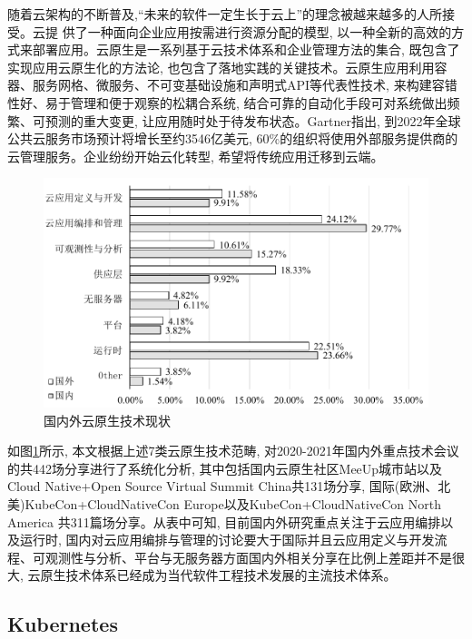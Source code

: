 随着云架构的不断普及,“未来的软件一定生长于云上”的理念被越来越多的人所接受。云提
供了一种面向企业应用按需进行资源分配的模型, 以一种全新的高效的方式来部署应用。云原生是一系列基于云技术体系和企业管理方法的集合, 既包含了实现应用云原生化的方法论, 也包含了落地实践的关键技术。云原生应用利用容器、服务网格、微服务、不可变基础设施和声明式API等代表性技术, 来构建容错性好、易于管理和便于观察的松耦合系统, 结合可靠的自动化手段可对系统做出频繁、可预测的重大变更, 让应用随时处于待发布状态。Gartner指出, 到2022年全球公共云服务市场预计将增长至约3546亿美元, 60\%的组织将使用外部服务提供商的云管理服务\cite{bhagavan2020achieving}。企业纷纷开始云化转型, 希望将传统应用迁移到云端。

\begin{figure}[h] %
    \centering %
    \includegraphics[width=0.9 \textwidth]{FIGs/chapter2/workshop.pdf} %
    \caption{国内外云原生技术现状} %
    \label{workshop} %
\end{figure}%

如图\ref{workshop}所示, 本文根据上述7类云原生技术范畴, 对2020-2021年国内外重点技术会议的共442场分享进行了系统化分析, 其中包括国内云原生社区MeeUp城市站以及Cloud Native+Open Source Virtual Summit China共131场分享, 国际(欧洲、北美)KubeCon+CloudNativeCon Europe以及KubeCon+CloudNativeCon North America 共311篇场分享。从表中可知, 目前国内外研究重点关注于云应用编排以及运行时, 国内对云应用编排与管理的讨论要大于国际并且云应用定义与开发流程、可观测性与分析、平台与无服务器方面国内外相关分享在比例上差距并不是很大, 云原生技术体系已经成为当代软件工程技术发展的主流技术体系。

\subsection{Kubernetes}

